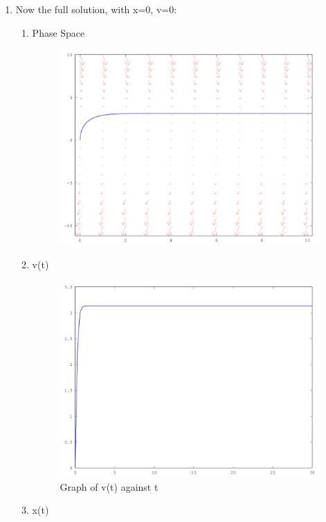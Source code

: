 \documentclass{article}
\begin{document}
\begin{enumerate}
\begin{enumerate}[label*=\arabic*.]
\begin{enumerate}[label=(\alph*)]
	\item Now the full solution, with x=0, v=0:
	\begin{enumerate}[label=(\roman*)]	
		\item Phase Space \begin{figure}[H]
			\includegraphics[width=\textwidth]{c_Full}
		\end{figure}
		\item v(t) \begin{figure}[H]
			\caption{Graph of v(t) against t}
			\includegraphics[width=\textwidth]{c_v}
		\end{figure}
		\item x(t) \begin{figure}[H]

\end{figure}
\end{enumerate}
\end{enumerate}
\end{enumerate}
\end{enumerate}
\end{document}
